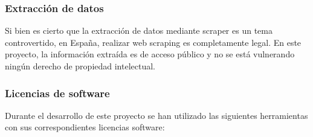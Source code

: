 \subsubsection{Extracción de datos}

Si bien es cierto que la extracción de datos mediante scraper es un tema controvertido, en España, realizar web scraping es completamente legal.
En este proyecto, la información extraída es de acceso público y no se está vulnerando ningún derecho de propiedad intelectual.\cite{webscraping}

\subsubsection{Licencias de software}

Durante el desarrollo de este proyecto se han utilizado las siguientes herramientas con sus correspondientes licencias software:

